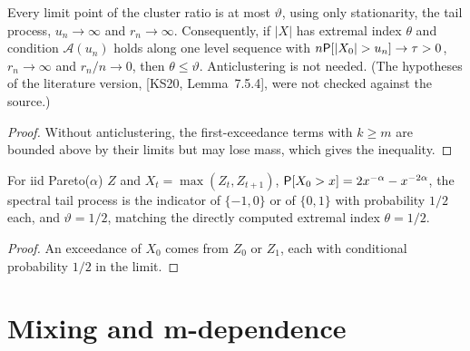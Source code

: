 \begin{theorem}
  \label{thm:theta-le-vartheta}
  \leanok
  Every limit point of the cluster ratio is at most $\vartheta$, using only stationarity, the tail
  process, $u_n \to \infty$ and $r_n \to \infty$. Consequently, if $|X|$ has extremal index $\theta$ and
  condition $\mathcal A(u_n)$ holds along one level sequence with $n \mathsf{P}[|X_0| > u_n] \to \tau > 0$,
  $r_n \to \infty$ and $r_n/n \to 0$, then $\theta \le \vartheta$. Anticlustering is not needed. (The
  hypotheses of the literature version, [KS20, Lemma~7.5.4], were not checked against the source.)
\end{theorem}
\begin{proof}
  \leanok
  Without anticlustering, the first-exceedance terms with $k \ge m$ are bounded above by their limits
  but may lose mass, which gives the inequality.
\end{proof}

\begin{proposition}[Moving maximum: $\theta = \vartheta = 1/2$]
  \label{prop:moving-max-vartheta}
  \leanok
  For iid Pareto($\alpha$) $Z$ and $X_t = \max(Z_t, Z_{t+1})$, $\mathsf{P}[X_0 > x] = 2x^{-\alpha} - x^{-2\alpha}$,
  the spectral tail process is the indicator of $\{-1, 0\}$ or of $\{0, 1\}$ with probability $1/2$
  each, and $\vartheta = 1/2$, matching the directly computed extremal index $\theta = 1/2$.
\end{proposition}
\begin{proof}
  \leanok
  An exceedance of $X_0$ comes from $Z_0$ or $Z_1$, each with conditional probability $1/2$ in the limit.
\end{proof}

\section{Mixing and m-dependence}

